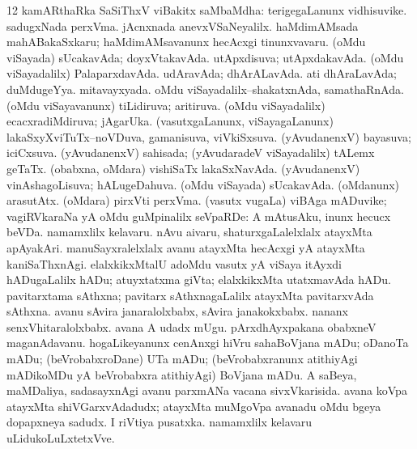 \num{12} kamARthaRka SaSiThxV viBakitx saMbaMdha:  terigegaLanunx vidhisuvike.  sadugxNada perxVma.  jAcnxnada anevxVSaNeyalilx.  haMdimAMsada mahABakaSxkaru; haMdimAMsavanunx hecAcxgi tinunxvavaru.  (oMdu viSayada) sUcakavAda; doyxVtakavAda.  utApxdisuva; utApxdakavAda.  (oMdu viSayadalilx) PalaparxdavAda.  udAravAda; dhArALavAda.  ati dhAraLavAda; duMdugeYya.  mitavayxyada.  oMdu viSayadalilx--shakatxnAda, samathaRnAda.  (oMdu viSayavanunx) tiLidiruva; aritiruva.  (oMdu viSayadalilx) ecacxradiMdiruva; jAgarUka.  (vasutxgaLanunx, viSayagaLanunx) lakaSxyXviTuTx--noVDuva, gamanisuva, viVkiSxsuva.  (yAvudanenxV) bayasuva; iciCxsuva.  (yAvudanenxV) sahisada; (yAvudaradeV viSayadalilx) tALemx geTaTx.  (obabxna, oMdara) vishiSaTx lakaSxNavAda.  (yAvudanenxV) vinAshagoLisuva; hALugeDahuva.  (oMdu viSayada) sUcakavAda.  (oMdanunx) arasutAtx.  (oMdara) pirxVti perxVma. 
 (vasutx \mo vugaLa) viBAga mADuvike; vagiRVkaraNa yA oMdu guMpinalilx seVpaRDe:  A mAtusAku, inunx hecucx beVDa.  
\banum
{} namamxlilx kelavaru. 
 nAvu aivaru,  shaturxgaLalelxlalx atayxMta apAyakAri.  manuSayxralelxlalx avanu atayxMta hecAcxgi yA atayxMta kaniSaThxnAgi.  elalxkikxMtalU adoMdu vasutx yA viSaya itAyxdi  hADugaLalilx hADu; atuyxtatxma giVta; elalxkikxMta utatxmavAda hADu.  pavitarxtama sAthxna; pavitarx sAthxnagaLalilx atayxMta pavitarxvAda sAthxna.  avanu sAvira janaralolxbabx, sAvira janakokxbabx.  nananx senxVhitaralolxbabx.  avana A udadx mUgu.  pArxdhAyxpakana obabxneV maganAdavanu.  hogaLikeyanunx cenAnxgi hiVru  sahaBoVjana mADu; oDanoTa mADu; (beVrobabxroDane) UTa mADu; (beVrobabxranunx atithiyAgi mADikoMDu yA beVrobabxra atithiyAgi) BoVjana mADu.  A saBeya, maMDaliya, sadasayxnAgi avanu parxmANa vacana sivxVkarisida.  avana koVpa atayxMta shiVGarxvAdadudx; atayxMta muMgoVpa avanadu  oMdu bgeya dopapxneya sadudx.  I riVtiya pusatxka.  namamxlilx kelavaru uLidukoLuLxtetxVve. 
